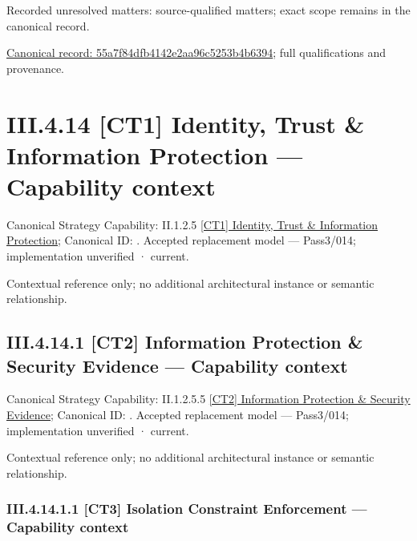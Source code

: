 {\small Recorded unresolved matters: source-qualified matters; exact scope remains in the canonical record.}\par
{\footnotesize \href{../../../../../../../../continuum/business/business-service/55a7f84dfb4142e2aa96c5253b4b6394.md}{Canonical record: 55a7f84dfb4142e2aa96c5253b4b6394}; full qualifications and provenance.}\par
\section*{III.4.14 [CT1] Identity, Trust \& Information Protection — Capability context}
\label{navigation:III.4.14}

{\small Canonical Strategy Capability: II.1.2.5 \hyperref[element:def358c06649413ba4773582e0d5c6d4]{[CT1] Identity, Trust \& Information Protection}; Canonical ID: \texttt{}. Accepted replacement model — Pass3/014; implementation unverified · current.}\par
Contextual reference only; no additional architectural instance or semantic relationship.\par
\subsection*{III.4.14.1 [CT2] Information Protection \& Security Evidence — Capability context}
\label{navigation:III.4.14.1}

{\small Canonical Strategy Capability: II.1.2.5.5 \hyperref[element:ece1a982b80e46e0a868b4865dfcdfc3]{[CT2] Information Protection \& Security Evidence}; Canonical ID: \texttt{}. Accepted replacement model — Pass3/014; implementation unverified · current.}\par
Contextual reference only; no additional architectural instance or semantic relationship.\par
\subsubsection*{III.4.14.1.1 [CT3] Isolation Constraint Enforcement — Capability context}
\label{navigation:III.4.14.1.1}

